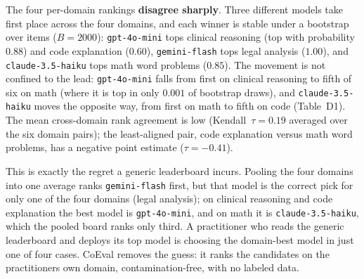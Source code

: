 \documentclass[11pt,a4paper]{article}
\begin{document}
The four per-domain rankings \textbf{disagree sharply}. Three different models take first place across the four
domains, and each winner is stable under a bootstrap over items (\(B=2000\)): \texttt{gpt-4o-mini} tops clinical
reasoning (top with probability \(0.88\)) and code explanation (\(0.60\)), \texttt{gemini-flash} tops legal analysis
(\(1.00\)), and \texttt{claude-3.5-haiku} tops math word problems (\(0.85\)). The movement is not confined to the lead:
\texttt{gpt-4o-mini} falls from first on clinical reasoning to fifth of six on math (where it is top in only
\(0.001\) of bootstrap draws), and \texttt{claude-3.5-haiku} moves the opposite way, from first on math to fifth on
code (Table~D1). The mean cross-domain rank agreement is low (Kendall~\(\tau = 0.19\) averaged over the six
domain pairs); the least-aligned pair, code explanation versus math word problems, has a negative point estimate
(\(\tau = -0.41\)).

This is exactly the regret a generic leaderboard incurs. Pooling the four domains into one average ranks
\texttt{gemini-flash} first, but that model is the correct pick for only one of the four domains (legal analysis);
on clinical reasoning and code explanation the best model is \texttt{gpt-4o-mini}, and on math it is
\texttt{claude-3.5-haiku}, which the pooled board ranks only third. A practitioner who reads the generic
leaderboard and deploys its top model is choosing the domain-best model in just one of four cases. CoEval removes the
guess: it ranks the candidates on the practitioner\textquotesingle s own domain, contamination-free, with no labeled data.
\end{document}
